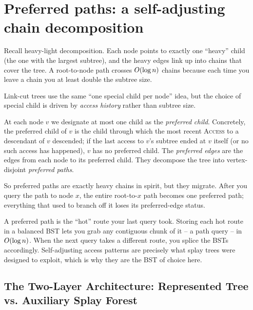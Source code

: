 \section{Preferred paths: a self-adjusting chain decomposition}
\label{ch22:preferred-paths}

Recall heavy-light decomposition. Each node points to exactly one ``heavy''
child (the one with the largest subtree), and the heavy edges link up into chains
that cover the tree. A root-to-node path crosses $O(\log n)$ chains because
each time you leave a chain you at least double the subtree size.

Link-cut trees use the same ``one special child per node'' idea, but the choice
of special child is driven by \emph{access history} rather than subtree size.

\begin{definition}
\label{ch22:def-preferred}
At each node $v$ we designate at most one child as the \emph{preferred child}.
Concretely, the preferred child of $v$ is the child through which the most
recent \textsc{Access} to a descendant of $v$ descended; if the last access to
$v$'s subtree ended at $v$ itself (or no such access has happened), $v$ has no
preferred child. The \emph{preferred edges} are the edges from each node to its
preferred child. They decompose the tree into vertex-disjoint
\emph{preferred paths}.
\end{definition}

So preferred paths are exactly heavy chains in spirit, but they migrate. After
you query the path to node $x$, the entire root-to-$x$ path becomes one
preferred path; everything that used to branch off it loses its preferred-edge
status.

\begin{intuitionbox}
A preferred path is the ``hot'' route your last query took. Storing each hot
route in a balanced BST lets you grab any contiguous chunk of it -- a path query
-- in $O(\log n)$. When the next query takes a different route, you splice the
BSTs accordingly. Self-adjusting access patterns are precisely what splay trees
were designed to exploit, which is why they are the BST of choice here.
\end{intuitionbox}

\subsection{The Two-Layer Architecture: Represented Tree vs. Auxiliary Splay Forest}

